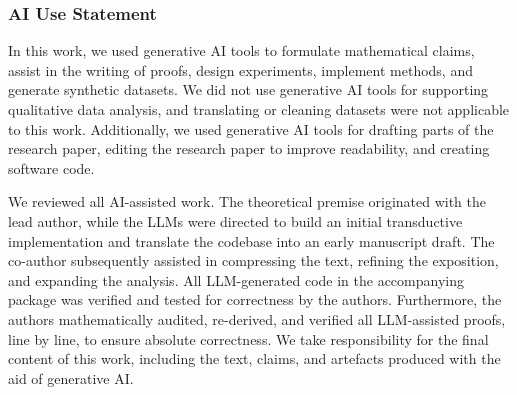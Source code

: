 \documentclass[twoside]{article}
\numberwithin{equation}{section}
\theoremstyle{plain}
\theoremstyle{definition}
\theoremstyle{remark}
\begin{document}
\subsubsection*{AI Use Statement}


In this work, we used generative AI tools to formulate mathematical claims, assist in the writing of proofs, design experiments, implement methods, and generate synthetic datasets. We did not use generative AI tools for supporting qualitative data analysis, and translating or cleaning datasets were not applicable to this work. Additionally, we used generative AI tools for drafting parts of the research paper, editing the research paper to improve readability, and creating software code.

We reviewed all AI-assisted work. The theoretical premise originated with the lead author, while the LLMs were directed to build an initial transductive implementation and translate the codebase into an early manuscript draft. The co-author subsequently assisted in compressing the text, refining the exposition, and expanding the analysis. All LLM-generated code in the accompanying package was verified and tested for correctness by the authors. Furthermore, the authors mathematically audited, re-derived, and verified all LLM-assisted proofs, line by line, to ensure absolute correctness. We take responsibility for the final content of this work, including the text, claims, and artefacts produced with the aid of generative AI.

\printbibliography

\clearpage
\onecolumn
\end{document}
